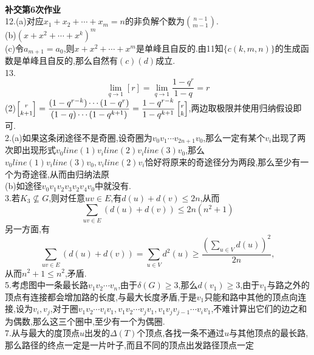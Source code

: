\documentclass[b5paper]{ctexart}
\newcommand{\qa}[2]{\left[ \substack{\vspace{1pt}\\#1\vspace{3pt}\\#2\vspace{1pt}}\right]}
\begin{document}
\pagestyle{plain}
\noindent
\\
\textbf{补交第6次作业}\\
12.(a)对应$x_1+x_2+\cdots+x_m=n$的非负解个数为$\binom{n-1}{m-1}$.\\
(b)$(x+x^2+\cdots+x^k)^m$\\
(c)令$a_{m+1}=a_0$,则$x+x^2+\cdots+x^m$是单峰且自反的.由11知$\{c(k,m,n)\}$的生成函数是单峰且自反的,那么自然有$(c)(d)$成立.\\
13.\[\lim_{q\to 1}\left[ r\right]=\lim_{q\to 1}\dfrac{1-q^r}{1-q}=r\]
(2)$\qa{r}{k+1}=\dfrac{(1-q^{r-k})\cdots(1-q^r)}{(1-q)\cdots(1-q^{k+1})}=\dfrac{1-q^{r-k}}{1-q^{k+1}}\qa{r}{k}$,两边取极限并使用归纳假设即可.\\
2.(a)如果这条闭途径不是奇圈,设奇圈为$v_0v_1\cdots v_{2n+1}v_0$,那么一定有某个$v_i$出现了两次即出现形式$v_0line(1)v_iline(2)v_iline(3)v_0$,那么$v_0line(1)v_iline(3)v_0,v_iline(2)v_i$恰好将原来的奇途径分为两段,那么至少有一个为奇途径,从而由归纳法原\\
(b)如途径$v_0v_1v_2v_3v_2v_4v_0$中就没有.\\
3.若$K_3\not\subseteq G$,则对任意$uv\in E$,有$d(u)+d(v)\leq 2n$,从而
\[\sum_{uv\in E}(d(u)+d(v))\leq 2n(n^2+1)\]
另一方面,有
\[\sum_{uv\in E}(d(u)+d(v))=\sum_{u\in V}d^2(u)\geq \dfrac{\left( \sum_{u\in V}d(u)\right)^2}{2n},\]
从而$n^2+1\leq n^2$,矛盾.\\
5.考虑图中一条最长路$v_1v_2\cdots v_n$,由于$\delta(G)\geq 3$,那么$d(v_1)\geq 3$,由于$v_1$与路之外的顶点有连接都会增加路的长度,与最大长度矛盾,于是$v_1$只能和路中其他的顶点向连接,设为$v_i,v_j$,对于圈$v_1v_2\cdots v_iv_1,v_1v_2\cdots v_jv_1,v_1v_jv_{j-1}\cdots v_iv_1$,不难计算出它们的边之和为偶数,那么这三个圈中,至少有一个为偶圈.\\
7.从与最大的度顶点$u$出发的$\Delta(T)$个顶点,各找一条不通过$u$与其他顶点的最长路,那么路径的终点一定是一片叶子,而且不同的顶点出发路径顶点一定
\end{document}
